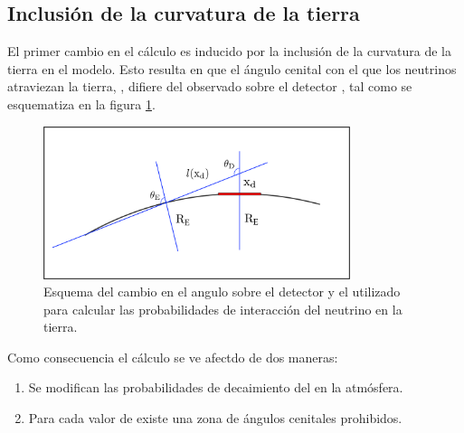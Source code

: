	\subsection{Inclusi\'on de la curvatura de la tierra}
	El primer cambio en el c\'alculo es inducido por la inclusi\'on de la curvatura de la tierra en el modelo. 
	Esto resulta en que el \'angulo cenital con el que los neutrinos atraviezan la tierra, \te{}, difiere del observado sobre el detector \td{}, tal como se esquematiza en la figura \ref{fig:curveEarthSketch0}.
	 \begin{figure}[ht!]
		\centering
		\includegraphics[width=0.8\textwidth]{./fig/appendix/curveEarthSketch.pdf}
		\caption{\label{fig:curveEarthSketch0}
		Esquema del cambio en el angulo sobre el detector y el utilizado para calcular las probabilidades de interacci\'on del neutrino en la tierra.
		}
	\end{figure}
	Como consecuencia el c\'alculo se ve afectdo de dos maneras:
	\begin{enumerate}
	 \item Se modifican las probabilidades de decaimiento del \tauon{} en la atm\'osfera.
	 \item Para cada valor de \xd{} existe una zona de \'angulos cenitales prohibidos.
	\end{enumerate}
	
